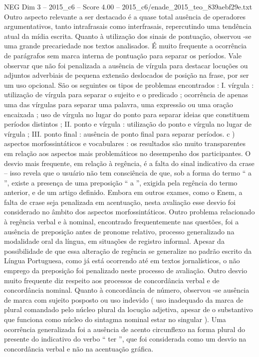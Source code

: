 \begin{textsample}{NEG Dim 3 – 2015\_c6 – Score 4.00 – 2015\_c6/enade\_2015\_teo\_839aebf29e.txt}
Outro aspecto relevante a ser destacado é a quase total ausência de operadores argumentativos, tanto intrafrasais como interfrasais, repercutindo uma tendência atual da mídia escrita.
Quanto à utilização dos sinais de pontuação, observou -se uma grande precariedade nos textos analisados.
É muito frequente a ocorrência de parágrafos sem marca interna de pontuação para separar os períodos.
Vale observar que não foi penalizada a ausência de vírgula para destacar locuções ou adjuntos adverbiais de pequena extensão deslocados de posição na frase, por ser um uso opcional.
São os seguintes os tipos de problemas encontrados : I. vírgula : utilização de vírgula para separar o sujeito e o predicado ; ocorrência de apenas uma das vírgulas para separar uma palavra, uma expressão ou uma oração encaixada ; uso de vírgula no lugar do ponto para separar ideias que constituem períodos distintos ; II. ponto e vírgula : utilização do ponto e vírgula no lugar de vírgula ; III. ponto final : ausência de ponto final para separar períodos. c ) aspectos morfossintáticos e vocabulares : os resultados são muito transparentes em relação aos aspectos mais problemáticos no desempenho dos participantes.
O desvio mais frequente, em relação à regência, é a falta do sinal indicativo da crase – isso revela que o usuário não tem consciência de que, sob a forma do termo “ a ”, existe a presença de uma preposição “ a ”, exigida pela regência do termo anterior, e de um artigo definido.
Embora em outros exames, como o Enem, a falta de crase seja penalizada em acentuação, nesta avaliação esse desvio foi considerado no âmbito dos aspectos morfossintáticos.
Outro problema relacionado à regência verbal e à nominal, encontrado frequentemente nas questões, foi a ausência de preposição antes de pronome relativo, processo generalizado na modalidade oral da língua, em situações de registro informal.
Apesar da possibilidade de que essa alteração de regência se generalize no padrão escrito da Língua Portuguesa, como já está ocorrendo até em textos jornalísticos, o não emprego da preposição foi penalizado neste processo de avaliação.
Outro desvio muito frequente diz respeito aos processos de concordância verbal e de concordância nominal.
Quanto à concordância de número, observou -se ausência de marca com sujeito posposto ou uso indevido ( uso inadequado da marca de plural comandado pelo núcleo plural da locução adjetiva, apesar de o substantivo que funciona como núcleo do sintagma nominal estar no singular ).
Uma ocorrência generalizada foi a ausência de acento circunflexo na forma plural do presente do indicativo do verbo “ ter ”, que foi considerada como um desvio na concordância verbal e não na acentuação gráfica.

\end{textsample}
